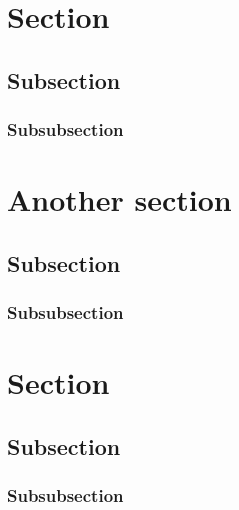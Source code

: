 \documentclass{article}
\begin{document}
\tableofcontents
\newpage

\section{Section}
\subsection{Subsection}
\subsubsection{Subsubsection}

\section{Another section}
\subsection{Subsection}
\subsubsection{Subsubsection}


\section{Section}
\subsection{Subsection}
\subsubsection{Subsubsection}
\end{document}
